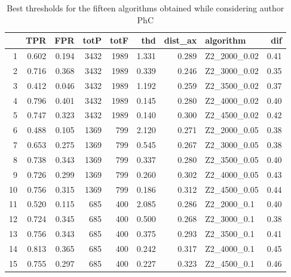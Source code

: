 \documentclass{article}\usepackage[]{graphicx}\usepackage[]{color}
\begin{document}
\begin{table}[ht]
\centering
\begin{tabular}{rrrrrrrlr}
  \hline
 & TPR & FPR & totP & totF & thd & dist\_ax & algorithm & dif \\ 
  \hline
1 & 0.602 & 0.194 & 3432 & 1989 & 1.331 & 0.289 & Z2\_2000\_0.02 & 0.41 \\ 
  2 & 0.716 & 0.368 & 3432 & 1989 & 0.339 & 0.246 & Z2\_3000\_0.02 & 0.35 \\ 
  3 & 0.412 & 0.046 & 3432 & 1989 & 1.192 & 0.259 & Z2\_3500\_0.02 & 0.37 \\ 
  4 & 0.796 & 0.401 & 3432 & 1989 & 0.145 & 0.280 & Z2\_4000\_0.02 & 0.40 \\ 
  5 & 0.747 & 0.323 & 3432 & 1989 & 0.140 & 0.300 & Z2\_4500\_0.02 & 0.42 \\ 
  6 & 0.488 & 0.105 & 1369 & 799 & 2.120 & 0.271 & Z2\_2000\_0.05 & 0.38 \\ 
  7 & 0.653 & 0.275 & 1369 & 799 & 0.545 & 0.267 & Z2\_3000\_0.05 & 0.38 \\ 
  8 & 0.738 & 0.343 & 1369 & 799 & 0.337 & 0.280 & Z2\_3500\_0.05 & 0.40 \\ 
  9 & 0.726 & 0.299 & 1369 & 799 & 0.260 & 0.302 & Z2\_4000\_0.05 & 0.43 \\ 
  10 & 0.756 & 0.315 & 1369 & 799 & 0.186 & 0.312 & Z2\_4500\_0.05 & 0.44 \\ 
  11 & 0.520 & 0.115 & 685 & 400 & 2.085 & 0.286 & Z2\_2000\_0.1 & 0.40 \\ 
  12 & 0.724 & 0.345 & 685 & 400 & 0.500 & 0.268 & Z2\_3000\_0.1 & 0.38 \\ 
  13 & 0.756 & 0.343 & 685 & 400 & 0.375 & 0.293 & Z2\_3500\_0.1 & 0.41 \\ 
  14 & 0.813 & 0.365 & 685 & 400 & 0.242 & 0.317 & Z2\_4000\_0.1 & 0.45 \\ 
  15 & 0.755 & 0.297 & 685 & 400 & 0.227 & 0.323 & Z2\_4500\_0.1 & 0.46 \\ 
   \hline
\end{tabular}
\caption{Best thresholds for the fifteen algorithms obtained while considering author PhC} 
\end{table}
\end{document}
